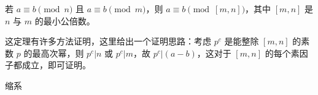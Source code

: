 \begin{theorem}{}
若 $a \equiv b \pmod n$ 且 $a \equiv b \pmod m$，则 $a \equiv b \pmod{[m, n]}$，其中 $[m, n]$ 是 $n$ 与 $m$ 的最小公倍数。
\end{theorem}
这定理有许多方法证明，这里给出一个证明思路：考虑 $p^c$ 是能整除 $[m, n]$ 的素数 $p$ 的最高次幂，则 $p^c | n$ 或 $p^c | m$，故 $p^c | (a - b)$，这对于 $[m, n]$ 的每个素因子都成立，即可证明。

\begin{definition}{缩系}

\end{definition}